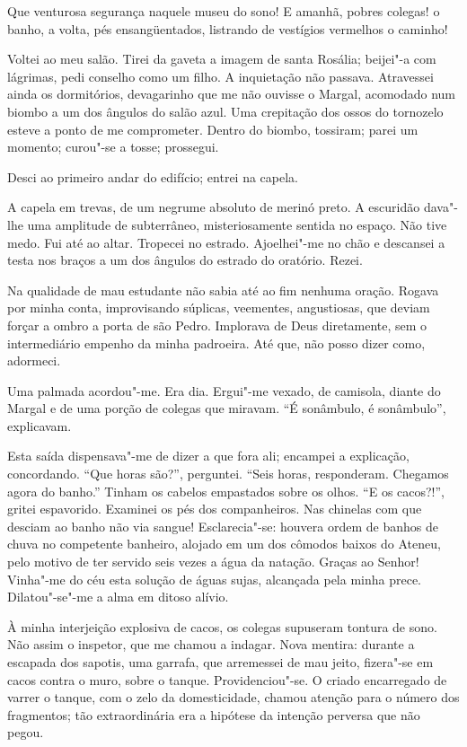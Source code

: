 Que venturosa segurança naquele museu do
sono! E amanhã, pobres colegas! o banho, a volta, pés ensangüentados,
listrando de vestígios vermelhos o caminho! 


\indent Voltei ao meu salão. Tirei
da gaveta a imagem de santa Rosália; beijei"-a com lágrimas, pedi
conselho como um filho. A inquietação não passava. Atravessei ainda os
dormitórios, devagarinho que me não ouvisse o Margal, acomodado num
biombo a um dos ângulos do salão azul. Uma crepitação dos ossos do
tornozelo esteve a ponto de me comprometer. Dentro do biombo, tossiram;
parei um momento; curou"-se a tosse; prossegui. 

Desci ao primeiro andar do edifício; entrei na capela. 

A capela em trevas, de um negrume
absoluto de merinó preto. A escuridão dava"-lhe uma amplitude de
subterrâneo, misteriosamente sentida no espaço. Não tive medo. Fui até
ao altar. Tropecei no estrado. Ajoelhei"-me no chão e descansei a
testa nos braços a um dos ângulos do estrado do oratório. Rezei. 

Na qualidade de mau estudante não sabia até ao fim nenhuma oração. Rogava
por minha conta, improvisando súplicas, veementes, angustiosas, 
que deviam forçar a ombro a porta de são Pedro. Implorava de Deus diretamente, sem o
intermediário empenho da minha padroeira. Até que, não posso dizer
como, adormeci. 

Uma palmada acordou"-me. Era dia. Ergui"-me vexado,
de camisola, diante do Margal e de uma porção de colegas que miravam.
``É sonâmbulo, é sonâmbulo'', explicavam. 

Esta saída dispensava"-me de
dizer a que fora ali; encampei a explicação, concordando. ``Que horas
são?'', perguntei. ``Seis horas, responderam. Chegamos agora do banho.''
Tinham os cabelos empastados sobre os olhos. ``E os cacos?!'', gritei
espavorido. Examinei os pés dos companheiros. Nas chinelas com que
desciam ao banho não via sangue! Esclarecia"-se: houvera ordem de
banhos de chuva no competente banheiro, alojado em um dos cômodos
baixos do Ateneu, pelo motivo de ter servido seis vezes a água da
natação. Graças ao Senhor! Vinha"-me do céu esta solução de águas
sujas, alcançada pela minha prece. Dilatou"-se"-me a alma em ditoso alívio. 

À minha interjeição explosiva de cacos, os colegas supuseram
tontura de sono. Não assim o inspetor, que me chamou a indagar. Nova
mentira: durante a escapada dos sapotis, uma garrafa, que arremessei de
mau jeito, fizera"-se em cacos contra o muro, sobre o tanque.
Providenciou"-se. O criado encarregado de varrer o tanque, com o zelo
da domesticidade, chamou atenção para o número dos fragmentos; tão
extraordinária era a hipótese da intenção perversa que não pegou. 

